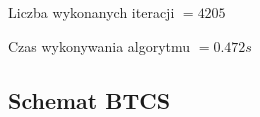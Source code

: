 Liczba wykonanych iteracji $ = 4205 $

Czas wykonywania algorytmu $ = 0.472 s$
\newpage
\subsection{Schemat BTCS}



